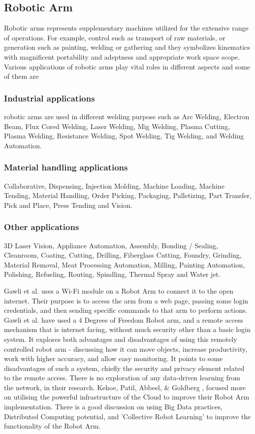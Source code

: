 \documentclass[conference]{IEEEtran}
\begin{document}
\subsection{Robotic Arm}
Robotic arms represents  supplementary machines utilized for the extensive range of operations. For example, control such as transport of raw materials, or  generation such as painting, welding or gathering and they symbolizes kinematics with magnificent portability and adeptness and appropriate work space scope. Various applications of robotic arms \cite{twelve} play vital roles in different aspects and some of them are

\subsubsection{Industrial applications}
robotic arms are used in different welding purpose such as Arc Welding, Electron Beam, Flux Cored Welding, Laser Welding, Mig Welding, Plasma Cutting, Plasma Welding, Resistance Welding, Spot Welding, Tig Welding, and Welding Automation.


\subsubsection{Material handling applications}
Collaborative, Dispensing, Injection Molding, Machine Loading, Machine Tending, Material Handling, Order Picking, Packaging, Palletizing, Part Transfer, Pick and Place, Press Tending and Vision.

\subsubsection{Other applications}
3D Laser Vision, Appliance Automation, Assembly, Bonding / Sealing, Cleanroom, Coating, Cutting, Drilling, Fiberglass Cutting, Foundry, Grinding, Material Removal, Meat Processing Automation, Milling, Painting Automation, Polishing, Refueling, Routing, Spindling, Thermal Spray and Water jet.

Gawli et al. \cite{thirteen} uses a Wi-Fi module on a Robot Arm to connect it to the open internet. Their purpose is to access the arm from a web page, passing some login credentials, and then sending specific commands to that arm to perform actions. Gawli et al. have used a 4 Degrees of Freedom Robot arm, and a remote access mechanism that is internet facing, without much security other than a basic login system. It explores both advantages and disadvantages of using this remotely controlled robot arm - discussing how it can move objects, increase productivity, work with higher accuracy, and allow easy monitoring. It points to some disadvantages of such a system, chiefly the security and privacy element related to the remote access. There is no exploration of any data-driven learning from the network, in their research. Kehoe, Patil, Abbeel, \& Goldberg \cite{fourteen}, focused more on utilising the powerful infrastructure of the Cloud to improve their Robot Arm implementation. There is a good discussion on using Big Data practices, Distributed Computing potential, and 'Collective Robot Learning' to improve the functionality of the Robot Arm.
\end{document}
